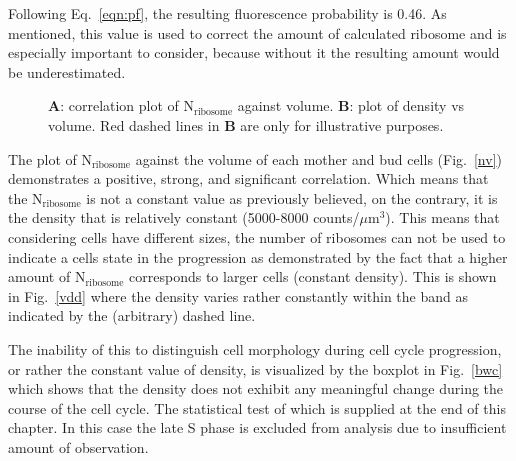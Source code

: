 Following Eq.~\ref{eqn:pf}, the resulting fluorescence probability is 0.46. As mentioned, this value is used to correct the amount of calculated ribosome and is especially important to consider, because without it the resulting amount would be underestimated.

\begin{figure}[!h]
\centering
{}\hfill
{}
\caption{\textbf{A}: correlation plot of N$_{\text{ribosome}}$ against volume. 
\textbf{B}: plot of density vs volume. 
Red dashed lines in \textbf{B} are only for illustrative purposes. }
\label{fig:corplot}
\end{figure}

The plot of N$_{\text{ribosome}}$ against the volume of each mother and bud cells (Fig.~\ref{nv}) demonstrates a positive, strong, and significant correlation. 
Which means that the N$_{\text{ribosome}}$ is not a constant value as previously believed, on the contrary, it is the density that is relatively constant (5000-8000 counts/$\mu$m$^3$).
This means that considering cells have different sizes, the number of ribosomes can not be used to indicate a cells state in the progression as demonstrated by the fact that a higher amount of N$_{\text{ribosome}}$ corresponds to larger cells (constant density). 
This is shown in Fig.~\ref{vdd} where the density varies rather constantly within the band as indicated by the (arbitrary) dashed line.

The inability of this to distinguish cell morphology during cell cycle progression, or rather the constant value of density, is visualized by the boxplot in Fig.~\ref{bwc} which shows that the density does not exhibit any meaningful change during the course of the cell cycle. 
The statistical test of which is supplied at the end of this chapter. In this case the late S phase is excluded from analysis due to insufficient amount of observation. 

